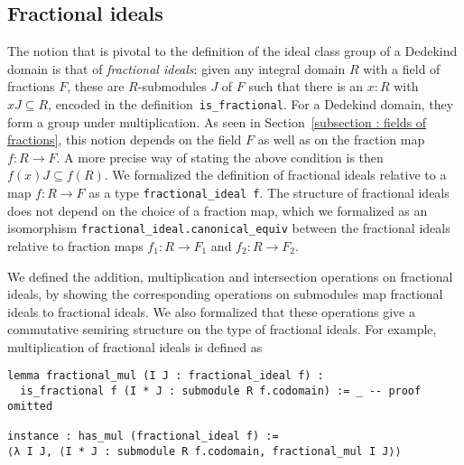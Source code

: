 \documentclass[a4paper,USenglish,cleveref, autoref, thm-restate]{lipics-v2021}
\newcommand{\lean}[1]{\texttt{#1}\xspace} %
\begin{document}
\subsection{Fractional ideals}\label{subsection:frac_ideals}
The notion that is pivotal to the definition of the ideal class group of a Dedekind domain is that of \emph{fractional ideals}: given any integral domain $R$ with a field of fractions $F$, these are 
$R$-submodules $J$ of $F$ such that there is an $x : R$ with $x J \subseteq R$, encoded in the definition~\lean{is\_fractional}. %
For a Dedekind domain, they form a group under multiplication. As seen in Section~\ref{subsection : fields of fractions}, this notion depends on the field $F$ as well as on the fraction map $f\colon R\to F$. A more precise way of stating the above condition is then 
$f(x)J\subseteq f(R)$. We formalized the definition of fractional ideals relative to a map $f\colon R\to F$ as a type \lean{fractional\_ideal f}. 
The structure of fractional ideals does not depend on the choice of a fraction map, which we formalized as an isomorphism \lean{fractional\_ideal.canonical\_equiv} between the fractional ideals relative to fraction maps $f_1\colon R\to F_1$ and $f_2\colon R\to F_2$.

We defined the addition, multiplication and intersection operations on fractional ideals,
by showing the corresponding operations on submodules map fractional ideals to fractional ideals.
We also formalized that these operations give a commutative semiring structure on the type of fractional ideals.
For example, multiplication of fractional ideals is defined as
\begin{lstlisting}
lemma fractional_mul (I J : fractional_ideal f) :
  is_fractional f (I * J : submodule R f.codomain) := _ -- proof omitted

instance : has_mul (fractional_ideal f) :=
⟨λ I J, ⟨I * J : submodule R f.codomain, fractional_mul I J⟩⟩
\end{lstlisting}
\end{document}
